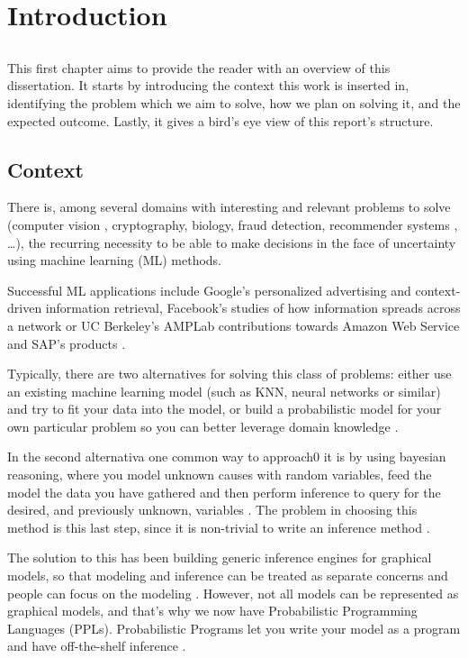 \chapter{Introduction} \label{chap:intro}

\section*{}

This first chapter aims to provide the reader with an overview of this
dissertation. It starts by introducing the context this work is inserted in,
identifying the problem which we aim to solve, how we plan on solving it, and
the expected outcome. Lastly, it gives a bird's eye view of this report's
structure.

\section{Context} \label{sec:context}

There is, among several domains with interesting and relevant problems to solve
(computer vision \cite{Kulkarni2015}, cryptography, biology, fraud detection,
recommender systems \cite{intml}, …), the recurring necessity to be able to
make decisions in the face of uncertainty using machine learning (ML) methods.

Successful ML applications include Google's personalized advertising and
context-driven information retrieval, Facebook's studies of how information
spreads across a network or UC Berkeley's AMPLab contributions towards Amazon
Web Service and SAP's products \cite{Broder:2015:BDN:2684822.2697027}.

Typically, there are two alternatives for solving this class of problems: either use an
existing machine learning model (such as KNN, neural networks or similar) \cite{mlnot} and
try to fit your data into the model, or build a probabilistic model for your
own particular problem so you can better leverage domain knowledge \cite{SciPy}.

In the second alternativa one common way to approach0 it is by using bayesian reasoning,
where you model unknown causes with random variables, feed the model the data you
have gathered and then perform inference to query for the
desired, and previously unknown, variables \cite{thbay}. The problem in choosing
this method is this last step, since it is non-trivial
to write an inference method \cite{Duvenaud}.

The solution to this has been building generic inference engines for graphical
models, so that modeling and inference can be treated as separate concerns and
people can focus on the modeling \cite{Jordan1996}. However, not all models can be represented as
graphical models, and that’s why we now have Probabilistic Programming Languages
(PPLs). Probabilistic Programs let you write your model as a program and have
off-the-shelf inference \cite{Prekopa2003}.

